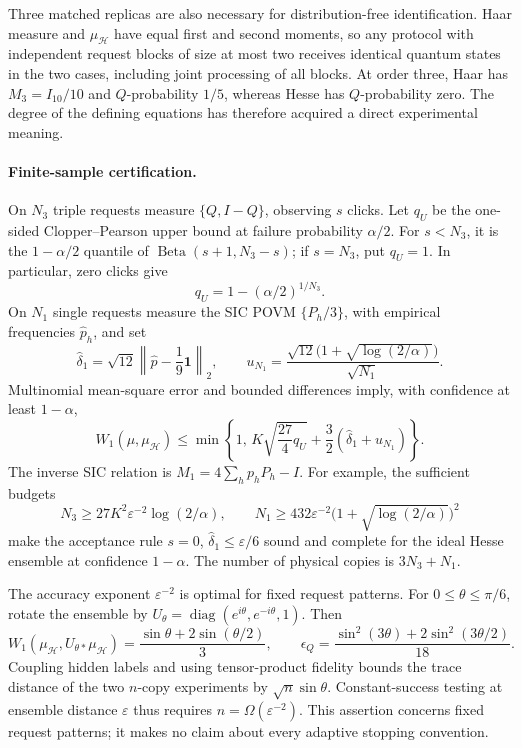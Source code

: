 Three matched replicas are also necessary for distribution-free
identification. Haar measure and \(\mu_{\mathcal H}\) have equal first
and second moments, so any protocol with independent request blocks of
size at most two receives identical quantum states in the two cases,
including joint processing of all blocks. At order three,
Haar has \(M_3=I_{10}/10\) and \(Q\)-probability \(1/5\), whereas Hesse
has \(Q\)-probability zero. The degree of the defining equations has
therefore acquired a direct experimental meaning.

\paragraph{Finite-sample certification.}
On \(N_3\) triple requests measure \(\{Q,I-Q\}\), observing \(s\) clicks.
Let \(q_U\) be the one-sided Clopper--Pearson upper bound at failure
probability \(\alpha/2\). For \(s<N_3\), it is the
\(1-\alpha/2\) quantile of \(\operatorname{Beta}(s+1,N_3-s)\); if
\(s=N_3\), put \(q_U=1\). In particular, zero clicks give
\[
 q_U=1-(\alpha/2)^{1/N_3}.
\]
On \(N_1\) single requests measure the SIC POVM \(\{P_h/3\}\),
with empirical frequencies \(\widehat p_h\), and set
\[
 \widehat\delta_1=\sqrt{12}
 \left\|\widehat p-\frac19\mathbf1\right\|_2,\qquad
 u_{N_1}=
 \frac{\sqrt{12}\bigl(1+\sqrt{\log(2/\alpha)}\bigr)}{\sqrt{N_1}}.
\]
Multinomial mean-square error and bounded differences imply, with
confidence at least \(1-\alpha\),
\begin{equation}
 W_1(\mu,\mu_{\mathcal H})
 \le\min\left\{1,\,
 K\sqrt{\frac{27}{4}q_U}
 +\frac32(\widehat\delta_1+u_{N_1})\right\}.
 \label{geo:confidence}
\end{equation}
The inverse SIC relation is \(M_1=4\sum_h p_hP_h-I\).
For example, the sufficient budgets
\[
 N_3\ge27K^2\varepsilon^{-2}\log(2/\alpha),\qquad
 N_1\ge432\varepsilon^{-2}
                 \bigl(1+\sqrt{\log(2/\alpha)}\bigr)^2
\]
make the acceptance rule \(s=0\),
\(\widehat\delta_1\le\varepsilon/6\) sound and complete for the ideal
Hesse ensemble at confidence \(1-\alpha\). The number of physical
copies is \(3N_3+N_1\).

The accuracy exponent \(\varepsilon^{-2}\) is optimal for fixed request
patterns. For \(0\le\theta\le\pi/6\), rotate the ensemble by
\(U_\theta=\operatorname{diag}(e^{i\theta},e^{-i\theta},1)\). Then
\[
 W_1(\mu_{\mathcal H},U_{\theta*}\mu_{\mathcal H})
 =\frac{\sin\theta+2\sin(\theta/2)}3,\qquad
 \epsilon_Q=
 \frac{\sin^2(3\theta)+2\sin^2(3\theta/2)}{18}.
\]
Coupling hidden labels and using tensor-product fidelity bounds the
trace distance of the two \(n\)-copy experiments by \(\sqrt n\sin\theta\).
Constant-success testing at ensemble distance \(\varepsilon\) thus
requires \(n=\Omega(\varepsilon^{-2})\). This assertion concerns
fixed request patterns; it makes no claim about every adaptive
stopping convention.


